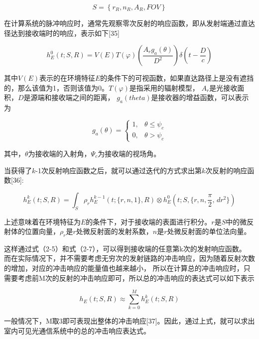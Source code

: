 \begin{equation}
    S=\left\{r_{R},n_{R},A_{R},FOV\right\}
\end{equation}

在计算系统的脉冲响应时，通常先观察零次反射的响应函数，即从发射端通过直达径达到接收端时的响应，表示如下[35]

\begin{equation}
    h_{E}^0(t;S,R)=V(E)T(\varphi)(\frac{A_{r}g_{a}(\theta)}{D^2})\delta(t-\frac{D}{c})
\end{equation}

其中$V(E)$表示的在环境特征$E$的条件下的可视函数，如果直达路径上是没有遮挡的，那么该值为1，否则该值为0。$T(\varphi)$是指采用的辐射模型，
$A_{r}$是光接收面积，$D$是源端和接收端之间的距离， $g_{a}(theta)$是接收器的增益函数，可以表示为

\begin{equation}
    g_{a}(\theta)=
    \begin{cases}
        1,  & \theta\le\psi_{c} \\
        0,  & \theta>\psi_{c}
    \end{cases}
\end{equation}

其中，$\theta$为接收端的入射角，$\Psi_{c}$为接收端的视场角。

当获得了$k$-1次反射响应函数之后，就可以通过迭代的方式求出第$k$次反射的响应函数[36]:

\begin{equation}
    h_{E}^k(t;S,R)=\int_{S} \rho_{r}h_{E}^{k-1}(t;\{r,n,1\},R)\otimes h_{E}^0(t;S,\{r,n,\frac{\pi}{2}, \, dr^2\})
\end{equation}

上述意味着在环境特征为$E$的条件下，对于接收端的表面进行积分。$r$是$S$中的微反射体的位置向量，$\rho_{r}$是$r$处微反射面的发射系数，$n$是$r$处微反射面的单位法向量。

这样通过式（2-5）和式（2-7），可以得到接收端的任意第k次的发射响应函数。
而在实际情况下，并不需要考虑无穷次的发射链路的冲击响应，因为随着反射次数的增加，对应的冲击响应的能量值也越来越小，
所以在计算总的冲击响应时，只需要考虑前M次的反射的冲击响应即可，所以总的冲击响应的表达式可以如下表示

\begin{equation}
    h_{E}(t;S,R)\approx \sum_{k=0}^M h_{E}^k(t;S,R)
\end{equation}

一般情况下，M取3即可表现出整体的冲击响应[37]。因此，通过上式，就可以求出室内可见光通信系统中的总的冲击响应表达式。

